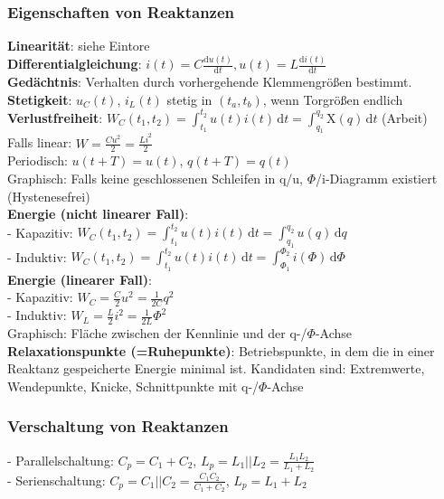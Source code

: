 \documentclass[fs, footer]{latex4ei}
\begin{document}
\begin{multicols*}{4}
    \subsubsection{Eigenschaften von Reaktanzen}
    \textbf{Linearität}: siehe Eintore\\
    \textbf{Differentialgleichung}: $i(t) = C \frac{\mathrm du(t)}{\mathrm dt}, u(t) = L \frac{\mathrm di(t)}{\mathrm dt}$\\
    \textbf{Gedächtnis}: Verhalten durch vorhergehende Klemmengrößen bestimmt.\\
    \textbf{Stetigkeit}: $u_C(t)$, $i_L(t)$ stetig in $(t_a, t_b)$, wenn Torgrößen endlich\\
    \textbf{Verlustfreiheit}: $W_C(t_1, t_2) = \int_{t_1}^{t_2}\! u(t)i(t)\,\mathrm dt = \int_{q_1}^{q_2}\! \mathrm{X}(q)\,\mathrm{d}t$ (Arbeit)\\
    Falls linear: $W = \frac{Cu^2}{2} = \frac{Li^2}{2}$\\
    Periodisch: $u(t+T) = u(t)$, $q(t+T) = q(t)$\\
    Graphisch: Falls keine geschlossenen Schleifen in q/u, $\Phi$/i-Diagramm existiert (Hystenesefrei)\\
    \textbf{Energie (nicht linearer Fall)}:\\
    - Kapazitiv: $W_C(t_1, t_2) = \int_{t_1}^{t_2} \! u(t)i(t)\, \mathrm dt = \int_{q_1}^{q_2} \! u(q)\, \mathrm dq$\\
    - Induktiv: $W_C(t_1, t_2) = \int_{t_1}^{t_2} \! u(t)i(t)\, \mathrm dt = \int_{\Phi_1}^{\Phi_2} \! i(\Phi)\, \mathrm d\Phi$\\
    \textbf{Energie (linearer Fall)}:\\
    - Kapazitiv: $W_C = \frac{C}{2}u^2 = \frac{1}{2C}q^2$\\
    - Induktiv: $W_L = \frac{L}{2}i^2 = \frac{1}{2L} \Phi^2$\\
    Graphisch: Fläche zwischen der Kennlinie und der q-/$\Phi$-Achse\\
    \textbf{Relaxationspunkte (=Ruhepunkte)}: Betriebspunkte, in dem die in einer Reaktanz gespeicherte Energie minimal ist. Kandidaten sind: Extremwerte, Wendepunkte, Knicke, Schnittpunkte mit q-/$\Phi$-Achse\\
    \subsubsection{Verschaltung von Reaktanzen}
    - Parallelschaltung: $C_p = C_1 + C_2$, $L_p = L_1 || L_2 = \frac{L_1L_2}{L_1+L_2}$\\
    - Serienschaltung: $C_p = C_1 || C_2 = \frac{C_1C_2}{C_1+C_2}$, $L_p = L_1 + L_2$\\



\end{multicols*}
\end{document}
